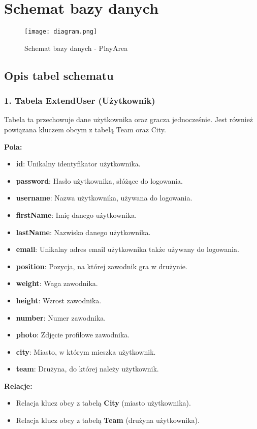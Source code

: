 \documentclass[wmii,inf,inz]{uwmthesis} %
\newenvironment{indenteditemize}
{\begin{itemize}[left=1cm]} %
{\end{itemize}}
\begin{document}
\section{Schemat bazy danych}
\begin{figure}[h!]
    \centering
    \texttt{[image: diagram.png]}
    \caption{Schemat bazy danych - PlayArea}
    \label{fig: Schemat bazy danych PlayArea}
\end{figure}
\subsection{Opis tabel schematu}
\subsubsection{1. Tabela ExtendUser (Użytkownik)}
Tabela ta przechowuje dane użytkownika oraz gracza jednocześnie. Jest również powiązana kluczem obcym z tabelą Team oraz City.

\textbf{Pola:}
\begin{indenteditemize}
    \item \textbf{id}: Unikalny identyfikator użytkownika.
    \item \textbf{password}: Hasło użytkownika, słóżące do logowania.
    \item \textbf{username}: Nazwa użytkownika, używana do logowania.
    \item \textbf{firstName}: Imię danego użytkownika.
    \item \textbf{lastName}: Nazwisko danego użytkownika.
    \item \textbf{email}: Unikalny adres email użytkownika także używany do logowania.
    \item \textbf{position}: Pozycja,  na której zawodnik gra w drużynie.
    \item \textbf{weight}: Waga zawodnika.
    \item \textbf{height}: Wzrost zawodnika.
    \item \textbf{number}: Numer zawodnika.
    \item \textbf{photo}: Zdjęcie profilowe zawodnika.
    \item \textbf{city}: Miasto, w którym mieszka użytkownik.
    \item \textbf{team}: Drużyna, do której należy użytkownik.
\end{indenteditemize}

\textbf{Relacje:}
\begin{indenteditemize}
    \item Relacja klucz obcy z tabelą \textbf{City} (miasto użytkownika).
    \item Relacja klucz obcy z tabelą \textbf{Team} (drużyna użytkownika).
\end{indenteditemize}
\end{document}
